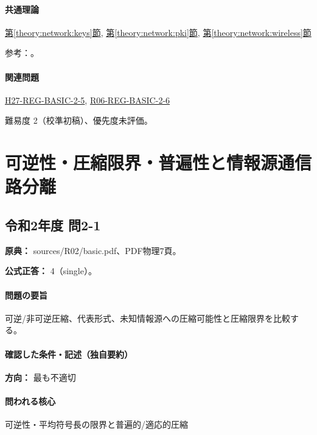 \paragraph{共通理論} \hyperref[theory:network:keys]{第\ref*{theory:network:keys}節}, \hyperref[theory:network:pki]{第\ref*{theory:network:pki}節}, \hyperref[theory:network:wireless]{第\ref*{theory:network:wireless}節}

\par 参考：\cite{net_pki,net_signature,net_wep}。

\paragraph{関連問題} \hyperref[q:h27-reg-basic-2-5]{H27-REG-BASIC-2-5}, \hyperref[q:r06-reg-basic-2-6]{R06-REG-BASIC-2-6}

\par 難易度 2（校準初稿）、優先度未評価。

\section{可逆性・圧縮限界・普遍性と情報源通信路分離}

\subsection{令和2年度 問2-1}
\label{q:r02-reg-basic-2-1}

\noindent\textbf{原典：} sources/R02/basic.pdf、PDF物理7頁。

\textbf{公式正答：} 4（single）。

\paragraph{問題の要旨} 可逆/非可逆圧縮、代表形式、未知情報源への圧縮可能性と圧縮限界を比較する。

\paragraph{確認した条件・記述（独自要約）}\mbox{}\par

\noindent\textbf{方向：} 最も不適切\par

\paragraph{問われる核心} 可逆性・平均符号長の限界と普遍的/適応的圧縮

